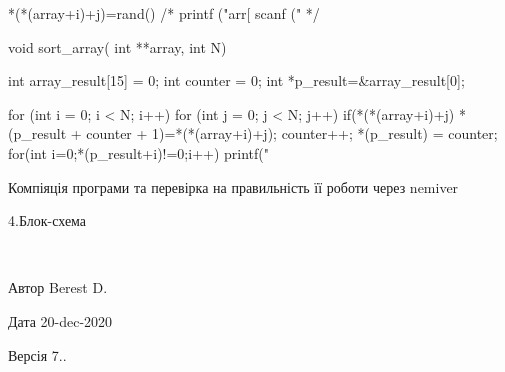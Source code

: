 \begin{DoxyEnumerate}
\begin{DoxyVerb}
{{{ *(*(array+i)+j)=rand()%
 /*
 printf ("arr[%
 scanf ("%
 */

 }
 }
 }  


 void sort_array( int **array, int N)
 {

 int array_result[15] = {0};
 int counter = 0;
 int *p_result=&array_result[0];

 for (int i = 0; i < N; i++)
 {
 for (int j = 0; j < N; j++)
 {
 if(*(*(array+i)+j)%
 { 
 *(p_result + counter + 1)=*(*(array+i)+j);
 counter++;
 }
 }
 }
 *(p_result) = counter;
 for(int i=0;*(p_result+i)!=0;i++)
 { 
 printf("%
 }
 }
\end{DoxyVerb}

\item Компіяція програми та перевірка на правильність її роботи через nemiver
\end{DoxyEnumerate}



4.Блок-\/схема

 ~\newline


\begin{DoxyAuthor}{Автор}
Berest D. 
\end{DoxyAuthor}
\begin{DoxyDate}{Дата}
20-\/dec-\/2020 
\end{DoxyDate}
\begin{DoxyVersion}{Версія}
7.. 
\end{DoxyVersion}
